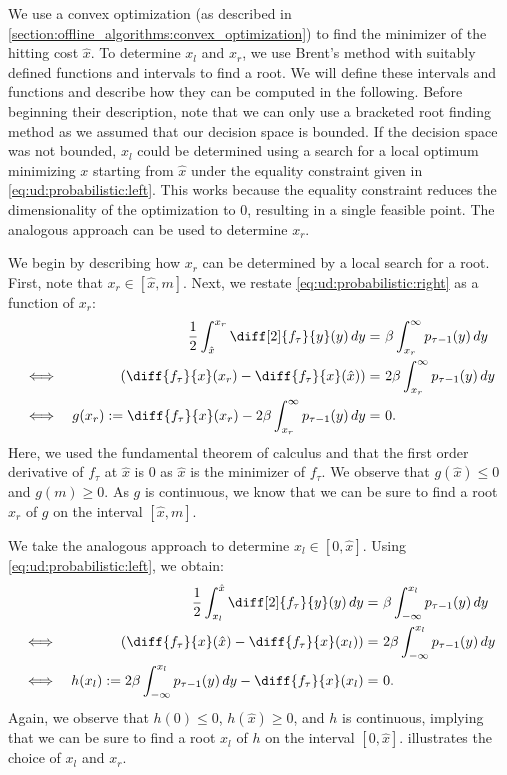 We use a convex optimization (as described in \cref{section:offline_algorithms:convex_optimization}) to find the minimizer of the hitting cost $\hat{x}$. To determine $x_l$ and $x_r$, we use Brent's method with suitably defined functions and intervals to find a root. We will define these intervals and functions and describe how they can be computed in the following. Before beginning their description, note that we can only use a bracketed root finding method as we assumed that our decision space is bounded. If the decision space was not bounded, $x_l$ could be determined using a search for a local optimum minimizing $x$ starting from $\hat{x}$ under the equality constraint given in \cref{eq:ud:probabilistic:left}. This works because the equality constraint reduces the dimensionality of the optimization to $0$, resulting in a single feasible point. The analogous approach can be used to determine $x_r$.

We begin by describing how $x_r$ can be determined by a local search for a root. First, note that $x_r \in [\hat{x},m]$. Next, we restate \cref{eq:ud:probabilistic:right} as a function of $x_r$: \begin{align*}
    && \frac{1}{2} \int_{\hat{x}}^{x_r} \diff[2]{f_{\tau}}{y}(y) \,dy =&\ \beta \int_{x_r}^{\infty} p_{\tau-1}(y) \,dy \\
    \iff&& \left(\diff{f_{\tau}}{x}(x_r) - \diff{f_{\tau}}{x}(\hat{x})\right) =&\ 2 \beta \int_{x_r}^{\infty} p_{\tau-1}(y) \,dy \\
    \iff&& g(x_r) := \diff{f_{\tau}}{x}(x_r) - 2 \beta \int_{x_r}^{\infty} p_{\tau-1}(y) \,dy =&\ 0.
\end{align*} Here, we used the fundamental theorem of calculus and that the first order derivative of $f_{\tau}$ at $\hat{x}$ is $0$ as $\hat{x}$ is the minimizer of $f_{\tau}$. We observe that $g(\hat{x}) \leq 0$ and $g(m) \geq 0$. As $g$ is continuous, we know that we can be sure to find a root $x_r$ of $g$ on the interval $[\hat{x},m]$.

We take the analogous approach to determine $x_l \in [0,\hat{x}]$. Using \cref{eq:ud:probabilistic:left}, we obtain: \begin{align*}
    && \frac{1}{2} \int_{x_l}^{\hat{x}} \diff[2]{f_{\tau}}{y}(y) \,dy =&\ \beta \int_{-\infty}^{x_l} p_{\tau-1}(y) \,dy \\
    \iff&& \left(\diff{f_{\tau}}{x}(\hat{x}) - \diff{f_{\tau}}{x}(x_l)\right) =&\ 2 \beta \int_{-\infty}^{x_l} p_{\tau-1}(y) \,dy \\
    \iff&& h(x_l) := 2 \beta \int_{-\infty}^{x_l} p_{\tau-1}(y) \,dy - \diff{f_{\tau}}{x}(x_l) =&\ 0.
\end{align*} Again, we observe that $h(0) \leq 0$, $h(\hat{x}) \geq 0$, and $h$ is continuous, implying that we can be sure to find a root $x_l$ of $h$ on the interval $[0,\hat{x}]$.  illustrates the choice of $x_l$ and $x_r$.

